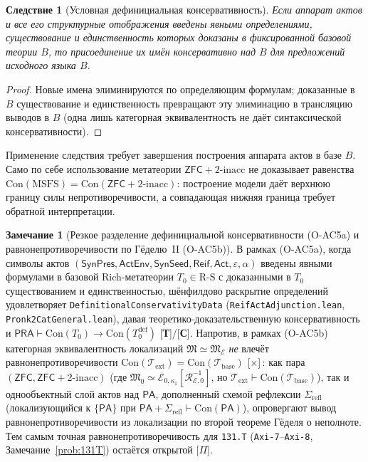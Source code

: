 \documentclass[11pt]{article}
\theoremstyle{plain}
\newtheorem{corollary}[theorem]{Следствие}
\theoremstyle{definition}
\newtheorem{remark}[theorem]{Замечание}
\newcommand{\RS}{\mathrm{R\text{-}S}}
\newcommand{\fM}{\mathfrak{M}}
\newcommand{\Con}{\mathrm{Con}}
\newcommand{\PA}{\mathsf{PA}}
\newcommand{\ZFC}{\mathsf{ZFC}}
\newcommand{\cE}{\mathcal{E}}
\begin{document}
\begin{corollary}[Условная дефинициальная консервативность]\label{cor:ac-oc-conservativity}
Если аппарат актов и все его структурные отображения введены явными определениями, существование и единственность которых доказаны в фиксированной базовой теории $B$, то присоединение их имён консервативно над $B$ для предложений исходного языка $B$.
\end{corollary}
\begin{proof}
Новые имена элиминируются по определяющим формулам; доказанные в $B$ существование и единственность превращают эту элиминацию в трансляцию выводов в $B$ (одна лишь категорная эквивалентность не даёт синтаксической консервативности).
\end{proof}
Применение следствия требует завершения построения аппарата актов в базе $B$. Само по себе использование метатеории $\ZFC + 2\text{-inacc}$ не доказывает равенства $\Con(\mathrm{MSFS}) = \Con(\ZFC + 2\text{-inacc})$: построение модели даёт верхнюю границу силы непротиворечивости, а совпадающая нижняя граница требует обратной интерпретации.

\begin{remark}[Резкое разделение дефинициальной консервативности \textup{(O-AC5a)} и равнонепротиворечивости по Гёделю~II \textup{(O-AC5b)}]\label{rem:oac5-godel-split}
В рамках \textup{(O-AC5a)}, когда символы актов $(\mathsf{SynPres}, \mathsf{ActEnv}, \mathsf{SynSeed}, \mathsf{Reif}, \mathsf{Act}, \varepsilon, \alpha)$ введены явными формулами в базовой Rich-метатеории $T_0 \in \RS$ с доказанными в $T_0$ существованием и единственностью, шёнфилдово раскрытие определений удовлетворяет \texttt{DefinitionalConservativityData} (\texttt{ReifActAdjunction.lean}, \texttt{Pronk2CatGeneral.lean}), давая теоретико-доказательственную консервативность и $\mathsf{PRA} \vdash \Con(T_0) \to \Con(T_0^{\mathrm{def}})$ \textup{[\textbf{Т}]/[\textbf{С}]}. Напротив, в рамках \textup{(O-AC5b)} категорная эквивалентность локализаций $\fM \simeq \fM_\cE$ \emph{не} влечёт равнонепротиворечивости $\Con(\mathcal{T}_{\mathrm{ext}}) = \Con(\mathcal{T}_{\mathrm{base}})$ \textup{[\textbf{$\times$}]}\,: как пара $(\ZFC, \ZFC+2\text{-}\mathrm{inacc})$ (где $\fM_0 \simeq \cE_{0,\kappa_1}[\mathcal{R}_{\cE,0}^{-1}]$, но $\mathcal{T}_{\mathrm{ext}} \vdash \Con(\mathcal{T}_{\mathrm{base}})$), так и однообъектный слой актов над $\PA$, дополненный схемой рефлексии $\Sigma_{\mathrm{refl}}$ (локализующийся к $\{\PA\}$ при $\PA + \Sigma_{\mathrm{refl}} \vdash \Con(\PA)$), опровергают вывод равнонепротиворечивости из локализации по второй теореме Гёделя о неполноте. Тем самым точная равнонепротиворечивость для \texttt{131.T} (\texttt{Axi-7}--\texttt{Axi-8}, Замечание~\ref{prob:131T}) остаётся открытой \textup{[\textbf{$\Pi$}]}.
\end{remark}
\end{document}
